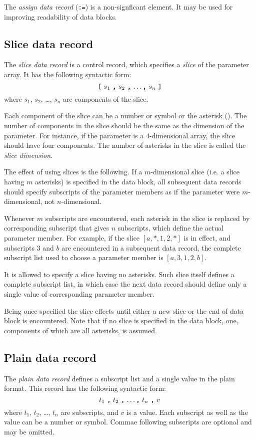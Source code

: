 \documentclass[11pt]{report}
\begin{document}
The {\it assign data record} ({\tt:=}) is a non-signficant element.
It may be used for improving readability of data blocks.

\subsection{Slice data record}

The {\it slice data record} is a control record, which specifies a
{\it slice} of the parameter array. It has the following syntactic
form:
$$\mbox{{\tt[} $s_1$ {\tt,} $s_2$ {\tt,} \dots {\tt,} $s_n$ {\tt]}}$$
where $s_1$, $s_2$, \dots, $s_n$ are components of the slice.

Each component of the slice can be a number or symbol or the asterisk
({\tt*}). The number of components in the slice should be the same as
the dimension of the parameter. For instance, if the parameter is a
4-dimensional array, the slice should have four components. The number
of asterisks in the slice is called the {\it slice dimension}.

The effect of using slices is the following. If a $m$-dimensional slice
(i.e. a slice having $m$ asterisks) is specified in the data block, all
subsequent data records should specify subscripts of the parameter
members as if the parameter were $m$-dimensional, not $n$-dimensional.

Whenever $m$ subscripts are encountered, each asterisk in the slice is
replaced by corresponding subscript that gives $n$ subscripts, which
define the actual parameter member. For example, if the slice
$[a,*,1,2,*]$ is in effect, and subscripts 3 and $b$ are encountered in
a subsequent data record, the complete subscript list used to choose a
parameter member is $[a,3,1,2,b]$.

It is allowed to specify a slice having no asterisks. Such slice itself
defines a complete subscript list, in which case the next data record
should define only a single value of corresponding parameter member.

Being once specified the slice effects until either a new slice or the
end of data block is encountered. Note that if no slice is specified in
the data block, one, components of which are all asterisks, is assumed.

\subsection{Plain data record}

The {\it plain data record} defines a subscript list and a single value
in the plain format. This record has the following syntactic form:
$$\mbox{$t_1$ {\tt,} $t_2$ {\tt,} \dots {\tt,} $t_n$ {\tt,} $v$}$$
where $t_1$, $t_2$, \dots, $t_n$ are subscripts, and $v$ is a value.
Each subscript as well as the value can be a number or symbol. Commae
following subscripts are optional and may be omitted.
\end{document}
